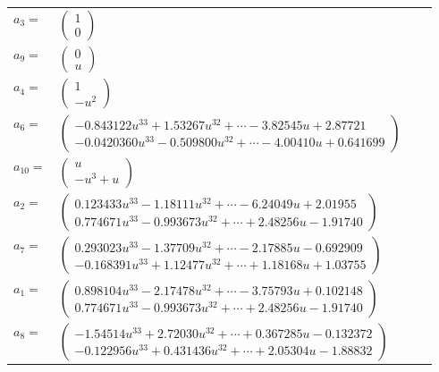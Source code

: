 \documentclass[1p]{elsarticle_modified}
\theoremstyle{definition}
\begin{document}
\begin{tabular}{m{7pt} m{180pt} m{7pt} m{180pt} }
\flushright $a_{3}=$&$\begin{pmatrix}1\\0\end{pmatrix}$ \\
\flushright $a_{9}=$&$\begin{pmatrix}0\\u\end{pmatrix}$ \\
\flushright $a_{4}=$&$\begin{pmatrix}1\\- u^2\end{pmatrix}$ \\
\flushright $a_{6}=$&$\begin{pmatrix}-0.843122 u^{33}+1.53267 u^{32}+\cdots-3.82545 u+2.87721\\-0.0420360 u^{33}-0.509800 u^{32}+\cdots-4.00410 u+0.641699\end{pmatrix}$ \\
\flushright $a_{10}=$&$\begin{pmatrix}u\\- u^3+u\end{pmatrix}$ \\
\flushright $a_{2}=$&$\begin{pmatrix}0.123433 u^{33}-1.18111 u^{32}+\cdots-6.24049 u+2.01955\\0.774671 u^{33}-0.993673 u^{32}+\cdots+2.48256 u-1.91740\end{pmatrix}$ \\
\flushright $a_{7}=$&$\begin{pmatrix}0.293023 u^{33}-1.37709 u^{32}+\cdots-2.17885 u-0.692909\\-0.168391 u^{33}+1.12477 u^{32}+\cdots+1.18168 u+1.03755\end{pmatrix}$ \\
\flushright $a_{1}=$&$\begin{pmatrix}0.898104 u^{33}-2.17478 u^{32}+\cdots-3.75793 u+0.102148\\0.774671 u^{33}-0.993673 u^{32}+\cdots+2.48256 u-1.91740\end{pmatrix}$ \\
\flushright $a_{8}=$&$\begin{pmatrix}-1.54514 u^{33}+2.72030 u^{32}+\cdots+0.367285 u-0.132372\\-0.122956 u^{33}+0.431436 u^{32}+\cdots+2.05304 u-1.88832\end{pmatrix}$ \\

\end{tabular}
\end{document}
